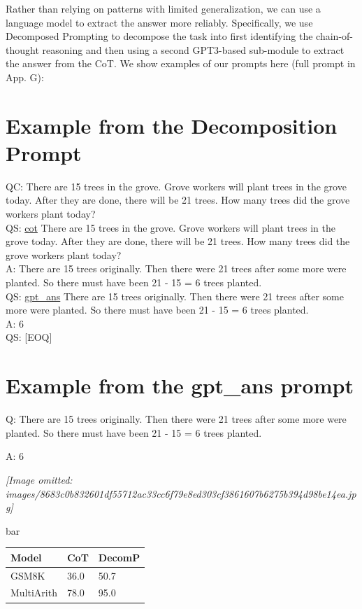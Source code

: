 \documentclass[
]{article}
\newcounter{none} %
\begin{document}
Rather than relying on patterns with limited generalization, we can use
a language model to extract the answer more reliably. Specifically, we
use Decomposed Prompting to decompose the task into first identifying
the chain-of-thought reasoning and then using a second GPT3-based
sub-module to extract the answer from the CoT. We show examples of our
prompts here (full prompt in App. G):

\section{Example from the Decomposition
Prompt}\label{example-from-the-decomposition-prompt}

QC: There are 15 trees in the grove. Grove workers will plant trees in
the grove today. After they are done, there will be 21 trees. How many
trees did the grove workers plant today?\\
QS: \hyperref[cot]{cot} There are 15 trees in the grove. Grove workers
will plant trees in the grove today. After they are done, there will be
21 trees. How many trees did the grove workers plant today?\\
A: There are 15 trees originally. Then there were 21 trees after some
more were planted. So there must have been 21 - 15 = 6 trees planted.\\
QS: \hyperref[gpt_ans]{gpt\_ans} There are 15 trees originally. Then
there were 21 trees after some more were planted. So there must have
been 21 - 15 = 6 trees planted.\\
A: 6\\
QS: {[}EOQ{]}

\section{Example from the gpt\_ans
prompt}\label{example-from-the-gpt_ans-prompt}

Q: There are 15 trees originally. Then there were 21 trees after some
more were planted. So there must have been 21 - 15 = 6 trees planted.

A: 6

\textit{[Image omitted: images/8683c0b832601df55712ac33cc6f79e8ed303cf3861607b6275b394d98be14ea.jpg]}

bar

{\def\LTcaptype{none} %
\begin{longtable}[]{@{}lll@{}}
\toprule\noalign{}
Model & CoT & DecomP \\
\midrule\noalign{}
\endhead
\bottomrule\noalign{}
\endlastfoot
GSM8K & 36.0 & 50.7 \\
MultiArith & 78.0 & 95.0 \\
\end{longtable}
}
\end{document}

